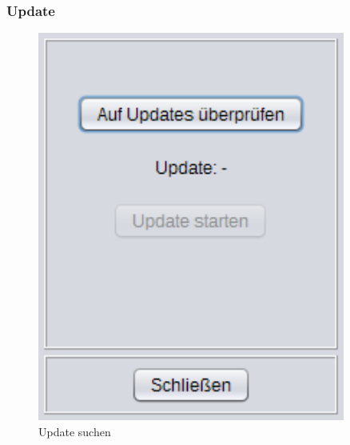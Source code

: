 \newpage

\subsubsection{Update}\label{subsubsec:Update}
\begin{figure}[H]
  \begin{minipage}[hbt]{0.45\textwidth}
    \includegraphics[width=0.9\textwidth]{Bilder/GUI/Update1}
 	\caption{Update suchen}
  	\label{Update}
  \end{minipage}
\hspace{.03\linewidth}
  \begin{minipage}[hbt]{0.45\textwidth}

\end{minipage}
\end{figure}
